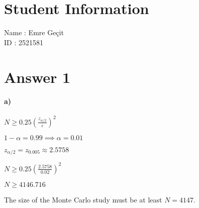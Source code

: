 \documentclass[12pt]{article}
\begin{document}
\section*{Student Information}

Name : Emre Geçit\\

ID : 2521581\\

\section*{Answer 1}
\paragraph{a)}
$N \geq 0.25(\frac{z_{\alpha/2}}{\varepsilon })^2$

$ 1 - \alpha = 0.99 \implies \alpha = 0.01$

$z_{\alpha/2} = z_{0.005} \approx 2.5758$

$N \geq 0.25(\frac{2.5758}{0.02})^2$

$N \geq 4146.716$

The size of the Monte Carlo study must be at least $N = 4147$.
\end{document}

